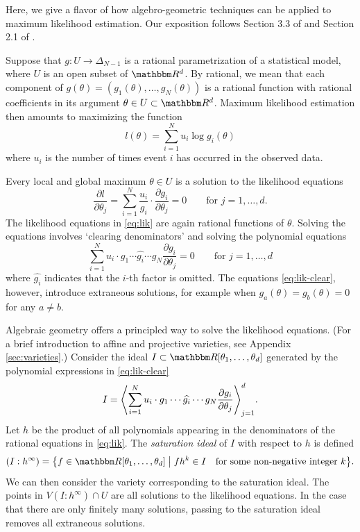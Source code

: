 \documentclass[11pt,titlepage]{article}
\numberwithin{equation}{section}
\begin{document}
    Here, we give a flavor of how algebro-geometric techniques can be applied to
    maximum likelihood estimation.  Our exposition follows Section 3.3 of
    \cite{ASCB} and Section 2.1 of \cite{DSS08}.

    Suppose that $g: U \to \Delta_{N-1}$ is a rational parametrization of a
    statistical model, where $U$ is an open subset of $\R^d$.  By rational, we
    mean that each component of $g(\theta) = (g_1(\theta), \ldots, g_N(\theta))$
    is a rational function with rational coefficients in its argument $\theta
    \in U \subset \R^d$.  Maximum likelihood estimation then amounts to
    maximizing the function
    \[
        l(\theta) = \sum_{i=1}^N u_i \log g_i(\theta)
    \] 
    where $u_i$ is the number of times event $i$ has occurred in the observed
    data.

    Every local and global maximum $\theta \in U$ is a solution to the
    likelihood equations
    \begin{equation}\label{eq:lik}
        \frac{\partial l}{\partial\theta_j}
        =
        \sum_{i=1}^N 
        \frac{u_i}{g_i} 
        \cdot
        \frac{\partial g_i}{\partial \theta_j}
        = 0
        \qquad
        \text{for $j = 1,\ldots,d$}.
    \end{equation}
    The likelihood equations in \eqref{eq:lik} are again rational functions of
    $\theta$.  Solving the equations involves `clearing denominators' and
    solving the polynomial equations
    \begin{equation}\label{eq:lik-clear}
        \sum_{i=1}^N 
        u_i \cdot g_1 \cdots \widehat{g_i} \cdots g_N
        \frac{\partial g_i}{\partial \theta_j}
        = 0
        \qquad
        \text{for $j = 1, \ldots, d$}
    \end{equation}
    where $\widehat{g_i}$ indicates that the $i$-th factor is omitted.  The
    equations \eqref{eq:lik-clear}, however, introduce extraneous solutions, for
    example when $g_a(\theta) = g_b(\theta) = 0$ for any $a \ne b$.

    Algebraic geometry offers a principled way to solve the likelihood
    equations.  (For a brief introduction to affine and projective varieties, see
    Appendix \ref{sec:varieties}.)  Consider the ideal $I \subset \R[\theta_1,
    \ldots, \theta_d]$ generated by the polynomial expressions in \eqref{eq:lik-clear}
    \[
        I = \adil[\Bigg]{
            \sum_{i=1}^N u_i \cdot g_1 \cdots \widehat{g_i} \cdots g_N
            \frac{\partial g_i}{\partial \theta_j}
        }_{j=1}^d
        .
    \]
    Let $h$ be the product of all polynomials appearing in the denominators of
    the rational equations in \eqref{eq:lik}.  The \emph{saturation ideal} of
    $I$ with respect to $h$ is defined
    \[
        (I : h^\infty) = \cdil[\big]{
            f \in \R[\theta_1, \ldots, \theta_d]
            \;\big\vert\;
            fh^k \in I
            \quad
            \text{for some non-negative integer $k$}
        }.
    \]
    We can then consider the variety corresponding to the saturation ideal.  The
    points in $V(I : h^\infty) \cap U$ are all solutions to the likelihood
    equations.  In the case that there are only finitely many solutions, passing
    to the saturation ideal removes all extraneous solutions.
\end{document}
